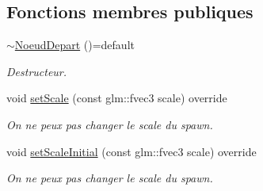 \subsection*{Fonctions membres publiques}
\begin{DoxyCompactItemize}
\item 
\hypertarget{class_noeud_depart_a6a1abd18717d2072edebff29d5d21995}{\hyperlink{class_noeud_depart_a6a1abd18717d2072edebff29d5d21995}{$\sim$\-Noeud\-Depart} ()=default}\label{class_noeud_depart_a6a1abd18717d2072edebff29d5d21995}

\begin{DoxyCompactList}\small\item\em Destructeur. \end{DoxyCompactList}\item 
\hypertarget{class_noeud_depart_ac02ac846dec4dd15b5ac2656c0907134}{void \hyperlink{class_noeud_depart_ac02ac846dec4dd15b5ac2656c0907134}{set\-Scale} (const glm\-::fvec3 scale) override}\label{class_noeud_depart_ac02ac846dec4dd15b5ac2656c0907134}

\begin{DoxyCompactList}\small\item\em On ne peux pas changer le scale du spawn. \end{DoxyCompactList}\item 
\hypertarget{class_noeud_depart_ac2889c3bb1f8f3d373261a93ea455f70}{void \hyperlink{class_noeud_depart_ac2889c3bb1f8f3d373261a93ea455f70}{set\-Scale\-Initial} (const glm\-::fvec3 scale) override}\label{class_noeud_depart_ac2889c3bb1f8f3d373261a93ea455f70}

\begin{DoxyCompactList}\small\item\em On ne peux pas changer le scale du spawn. \end{DoxyCompactList}\end{DoxyCompactItemize}
{\bf }\par
